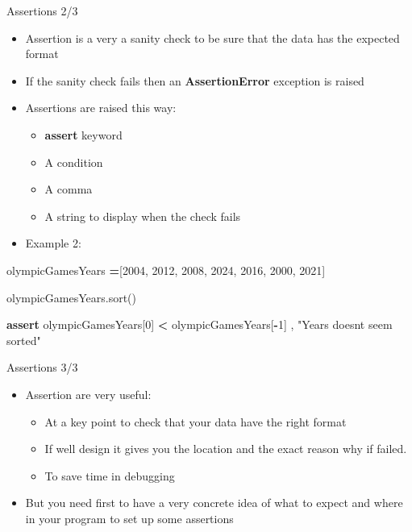 \documentclass[
  8pt,
  ignorenonframetext,
]{beamer}
\newenvironment{Shaded}{\begin{snugshade}}{\end{snugshade}}
\newcommand{\ControlFlowTok}[1]{\textcolor[rgb]{0.13,0.29,0.53}{\textbf{#1}}}
\newcommand{\DecValTok}[1]{\textcolor[rgb]{0.00,0.00,0.81}{#1}}
\newcommand{\NormalTok}[1]{#1}
\newcommand{\OperatorTok}[1]{\textcolor[rgb]{0.81,0.36,0.00}{\textbf{#1}}}
\newcommand{\StringTok}[1]{\textcolor[rgb]{0.31,0.60,0.02}{#1}}
\providecommand{\tightlist}{%
  \setlength{\itemsep}{0pt}\setlength{\parskip}{0pt}}
\begin{document}
\begin{frame}[fragile]{Assertions 2/3}
\protect\hypertarget{assertions-23}{}
\begin{itemize}
\item
  Assertion is a very a sanity check to be sure that the data has the
  expected format
\item
  If the sanity check fails then an \textbf{AssertionError} exception is
  raised
\item
  Assertions are raised this way:

  \begin{itemize}
  \tightlist
  \item
    \textbf{assert} keyword
  \item
    A condition
  \item
    A comma
  \item
    A string to display when the check fails
  \end{itemize}
\item
  Example 2:
\end{itemize}

\begin{Shaded}
\begin{Highlighting}[]
\NormalTok{olympicGamesYears }\OperatorTok{=}\NormalTok{[}\DecValTok{2004}\NormalTok{, }\DecValTok{2012}\NormalTok{, }\DecValTok{2008}\NormalTok{, }\DecValTok{2024}\NormalTok{, }\DecValTok{2016}\NormalTok{, }\DecValTok{2000}\NormalTok{, }\DecValTok{2021}\NormalTok{]}

\NormalTok{olympicGamesYears.sort()}

\ControlFlowTok{assert}\NormalTok{ olympicGamesYears[}\DecValTok{0}\NormalTok{] }\OperatorTok{\textless{}}\NormalTok{ olympicGamesYears[}\OperatorTok{{-}}\DecValTok{1}\NormalTok{] , }\StringTok{"Years doesn\textquotesingle{}t seem sorted"}
\end{Highlighting}
\end{Shaded}
\end{frame}

\begin{frame}{Assertions 3/3}
\protect\hypertarget{assertions-33}{}
\begin{itemize}
\tightlist
\item
  Assertion are very useful:

  \begin{itemize}
  \tightlist
  \item
    At a key point to check that your data have the right format
  \item
    If well design it gives you the location and the exact reason why if
    failed.
  \item
    To save time in debugging
  \end{itemize}
\item
  But you need first to have a very concrete idea of what to expect and
  where in your program to set up some assertions
\end{itemize}
\end{frame}
\end{document}
